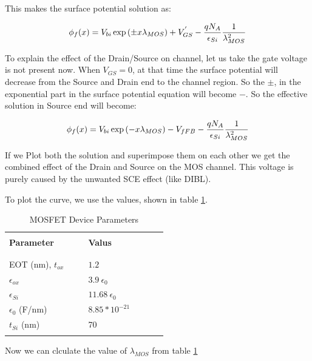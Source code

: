 \documentclass[a4paper]{article}
\begin{document}
This makes the surface potential solution as:

\begin{equation}
  \phi_f(x) = V_{bi} \exp \left({\pm x \lambda_{MOS}}\right) + V_{GS}^{'} - \frac{qN_A} {\epsilon_{Si}} \frac{1}{\lambda_{MOS}^2}
\end{equation}

To explain the effect of the Drain/Source on channel, let us take the gate voltage is not present now. When $V_{GS}=0$, at that time the surface potential will decrease from the Source and Drain end to the channel region. So the $\pm$, in the exponential part in the surface potential equation will become $-$. So the effective solution in Source end will become:

\begin{equation}
  \label{eq:MOS-sur-pot-S}
  \phi_f(x) = V_{bi} \exp \left({- x \lambda_{MOS}}\right) - V_{fFB} - \frac{qN_A} {\epsilon_{Si}} \frac{1}{\lambda_{MOS}^2}
\end{equation}

If we Plot both the solution and superimpose them on each other we get the combined effect of the Drain and Source on the MOS channel.
This voltage is purely caused by the unwanted SCE effect (like DIBL).

To plot the curve, we use the values, shown in table \ref{tab:MOS-device-table}.

\begin{table}[!h]
  \caption{MOSFET Device Parameters}
  \label{tab:MOS-device-table}
  \centering
  \begin{tabular}{p{0.4\linewidth} p{0.4\linewidth} }
    \hline
    \hline
     & \\
    \textbf{Parameter} & \textbf{Valus}\\
     & \\
    \hline
    & \\
    EOT (nm), $t_{ox}$ \cite{book:Q-FinFET} & $1.2$\\
    $\epsilon_{ox}$ & $3.9~\epsilon_0$\\
    $\epsilon_{Si}$ & $11.68~\epsilon_0$\\
    $\epsilon_0$ (F/nm) & $8.85 \ast 10^{-21}$\\
    $t_{Si}$ (nm) & 70\\
     & \\
    \hline
    \hline
  \end{tabular}
\end{table}

Now we can clculate the value of $\lambda_{MOS}$ from table \ref{tab:MOS-device-table}
\end{document}
